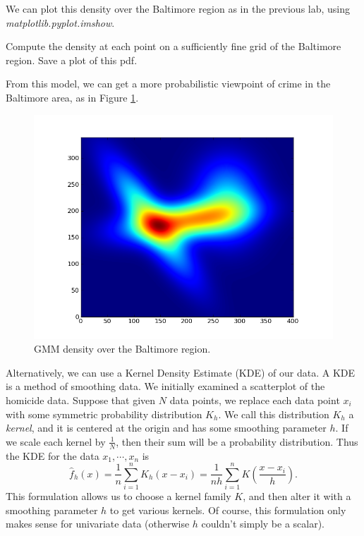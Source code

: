 We can plot this density over the Baltimore region as in the previous lab, using \emph{matplotlib.pyplot.imshow}.

\begin{problem}
Compute the density at each point on a sufficiently fine grid of the Baltimore region. Save a plot of this pdf.
\end{problem}

From this model, we can get a more probabilistic viewpoint of crime in the Baltimore area, as in Figure \ref{baltimoregmm}.

\begin{figure}[h]
\centering
\includegraphics[width=\textwidth]{baltimoregmm.png}
\caption{GMM density over the Baltimore region.}\label{baltimoregmm}
\end{figure}

Alternatively, we can use a Kernel Density Estimate (KDE) of our data. A KDE is a method of smoothing data. We initially examined a scatterplot of the homicide data. Suppose that given $N$ data points, we replace each data point $x_{i}$ with some symmetric probability distribution $K_{h}$. We call this distribution $K_{h}$ a \emph{kernel}, and it is centered at the origin and has some smoothing parameter $h$. If we scale each kernel by $\frac{1}{N}$, then their sum will be a probability distribution. Thus the KDE for the data $x_{1}, \cdots, x_{n}$ is
$$\widehat{f}_{h}(x) = \frac{1}{n} \sum_{i=1}^{n} K_{h}(x - x_{i}) = \frac{1}{nh} \sum_{i=1}^{n} K(\frac{x - x_{i}}{h}).$$ This formulation allows us to choose a kernel family $K$, and then alter it with a smoothing parameter $h$ to get various kernels. Of course, this formulation only makes sense for univariate data (otherwise $h$ couldn't simply be a scalar).

